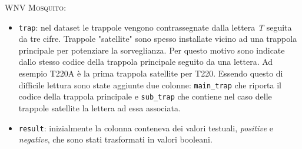 		
	\item \textsc{WNV Mosquito}:
	
	\begin{itemize}
		
		\item \texttt{trap}: nel dataset le trappole vengono contrassegnate 
		dalla lettera \textit{T} seguita da tre cifre. Trappole "satellite" 
		sono spesso installate vicino ad una trappola principale per potenziare 
		la sorveglianza. Per questo motivo sono indicate dallo stesso codice 
		della trappola principale seguito da una lettera. Ad esempio T220A è la 
		prima trappola satellite per T220. Essendo questo di difficile lettura 
		sono state aggiunte due colonne: \texttt{main\_trap} che riporta il 
		codice della trappola principale e \texttt{sub\_trap} che contiene nel 
		caso delle trappole satellite la lettera ad essa associata.
		
		\item \texttt{result}: inizialmente la colonna conteneva dei valori  
		testuali, \textit{positive} e \textit{negative}, che sono stati 
		trasformati in valori booleani.			
	\end{itemize}
